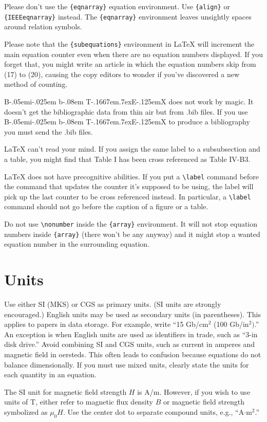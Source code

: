 \documentclass{ieeeaccess}
\def\BibTeX{{\rm B\kern-.05em{\sc i\kern-.025em b}\kern-.08em
    T\kern-.1667em\lower.7ex\hbox{E}\kern-.125emX}}
\begin{document}
Please don't use the \verb|{eqnarray}| equation environment. Use
\verb|{align}| or \verb|{IEEEeqnarray}| instead. The \verb|{eqnarray}|
environment leaves unsightly spaces around relation symbols.

Please note that the \verb|{subequations}| environment in {\LaTeX}
will increment the main equation counter even when there are no
equation numbers displayed. If you forget that, you might write an
article in which the equation numbers skip from (17) to (20), causing
the copy editors to wonder if you've discovered a new method of
counting.

{\BibTeX} does not work by magic. It doesn't get the bibliographic
data from thin air but from .bib files. If you use {\BibTeX} to produce a
bibliography you must send the .bib files. 

{\LaTeX} can't read your mind. If you assign the same label to a
subsubsection and a table, you might find that Table I has been cross
referenced as Table IV-B3. 

{\LaTeX} does not have precognitive abilities. If you put a
\verb|\label| command before the command that updates the counter it's
supposed to be using, the label will pick up the last counter to be
cross referenced instead. In particular, a \verb|\label| command
should not go before the caption of a figure or a table.

Do not use \verb|\nonumber| inside the \verb|{array}| environment. It
will not stop equation numbers inside \verb|{array}| (there won't be
any anyway) and it might stop a wanted equation number in the
surrounding equation.

\section{Units}
Use either SI (MKS) or CGS as primary units. (SI units are strongly 
encouraged.) English units may be used as secondary units (in parentheses). 
This applies to papers in data storage. For example, write ``15 
Gb/cm$^{2}$ (100 Gb/in$^{2})$.'' An exception is when 
English units are used as identifiers in trade, such as ``3\textonehalf-in 
disk drive.'' Avoid combining SI and CGS units, such as current in amperes 
and magnetic field in oersteds. This often leads to confusion because 
equations do not balance dimensionally. If you must use mixed units, clearly 
state the units for each quantity in an equation.

The SI unit for magnetic field strength $H$ is A/m. However, if you wish to use 
units of T, either refer to magnetic flux density $B$ or magnetic field 
strength symbolized as $\mu _{0}H$. Use the center dot to separate 
compound units, e.g., ``A$\cdot $m$^{2}$.''
\end{document}
